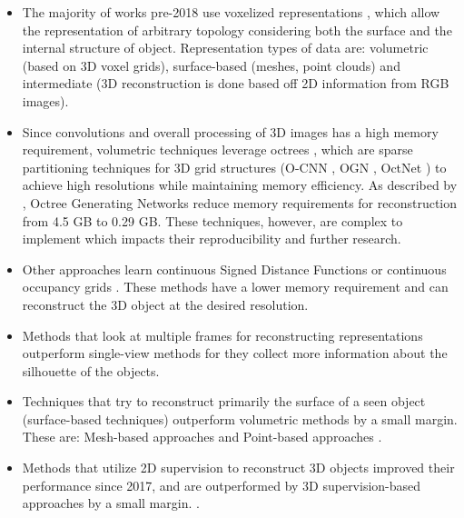\begin{itemize}

    \item The majority of works pre-2018 use voxelized representations \cite{yan2016perspective} \cite{choy20163d} \cite{wu2016learning}, which allow the representation of arbitrary topology considering both the surface and the internal structure of object. Representation types of data are: volumetric (based on 3D voxel grids), surface-based (meshes, point clouds) and intermediate (3D reconstruction is done based off 2D information from RGB images).
    \item Since convolutions and overall processing of 3D images has a high memory requirement, volumetric techniques leverage octrees \cite{meagher1980octree}, which are sparse partitioning techniques for 3D grid structures (O-CNN \cite{wang2017cnn}, OGN \cite{tatarchenko2017octree}, OctNet \cite{riegler2017octnet}) to achieve high resolutions while maintaining memory efficiency. As described by \textcite{tatarchenko2017octree}, Octree Generating Networks reduce memory requirements for reconstruction from 4.5 GB to 0.29 GB. These techniques, however, are complex to implement which impacts their reproducibility and further research.
    \item Other approaches learn continuous Signed Distance Functions \cite{park2019deepsdf, chen2019learning} or continuous occupancy grids \cite{mescheder2019occupancy}. These methods have a lower memory requirement and can reconstruct the 3D object at the desired resolution. 
    \item Methods that look at multiple frames for reconstructing representations outperform single-view methods for they collect more information about the silhouette of the objects. 
    \item Techniques that try to reconstruct primarily the surface of a seen object (surface-based techniques) outperform volumetric methods by a small margin. These are: Mesh-based approaches \cite{pontes2018image2mesh} and Point-based approaches \cite{kurenkov2018deformnet, fan2017point}.
    \item Methods that utilize 2D supervision to reconstruct 3D objects improved their performance since 2017, and are outperformed by 3D supervision-based approaches by a small margin. \cite{yan2016perspective, arsalan2017synthesizing}.
\end{itemize} 

    
    
